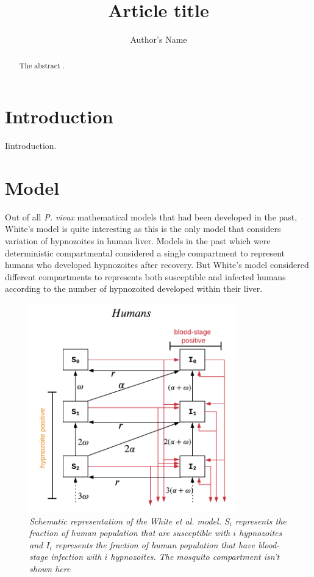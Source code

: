 \documentclass[12pt]{article}
\begin{document}
\title{Article title}
\author{Author's Name}

\maketitle

\begin{abstract}
The abstract .
\end{abstract}

\section{Introduction}Iintroduction.

\section{Model}
Out of all \textit{P. vivax} mathematical models that had been developed in the past, White's model\cite{white2014modelling} is quite interesting as this is the only model that considers variation of hypnozoites in human liver. Models in the past which were deterministic compartmental considered a single compartment to represent humans who developed hypnozoites after recovery. But White's model considered different compartments to represents both susceptible and infected humans according to the number of hypnozoited developed within their liver. 

\begin{figure}[h]
\centering
  \includegraphics[width=90mm]{White.png}
  \caption{\textit{Schematic representation of the White \textit{et al.} model. $S_i$ represents the fraction of human  population that are susceptible with $i$ hypnozoites and $I_i$ represents the fraction of human population that have  blood-stage infection with $i$ hypnozoites. The mosquito compartment isn't shown here}}
  \label{fig:white}
\end{figure}
\end{document}
